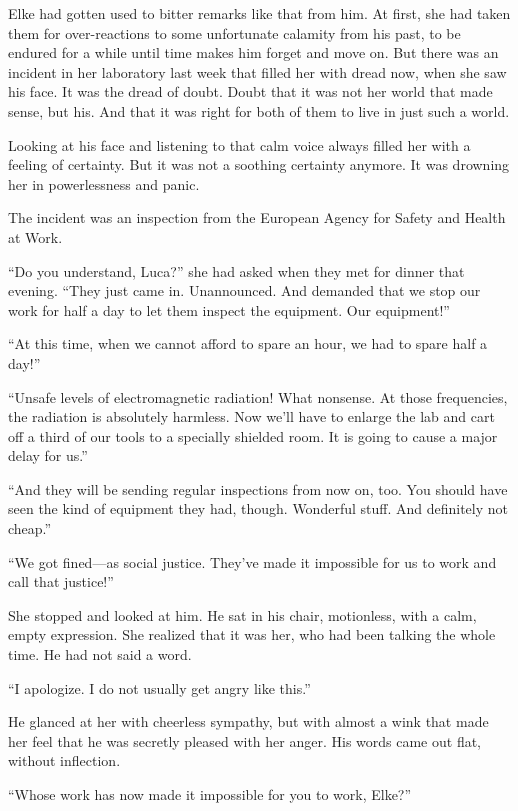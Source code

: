 \sectionline

Elke had gotten used to bitter remarks like that from him. At first, she had taken them for over-reactions to some unfortunate calamity from his past, to be endured for a while until time makes him forget and move on. But there was an incident in her laboratory last week that filled her with dread now, when she saw his face. It was the dread of doubt. Doubt that it was not her world that made sense, but his. And that it was right for both of them to live in just such a world.

Looking at his face and listening to that calm voice always filled her with a feeling of certainty. But it was not a soothing certainty anymore. It was drowning her in powerlessness and panic.

The incident was an inspection from the European Agency for Safety and Health at Work.

``Do you understand, Luca?'' she had asked when they met for dinner that evening. ``They just came in. Unannounced. And demanded that we stop our work for half a day to let them inspect the equipment. Our equipment!''

``At this time, when we cannot afford to spare an hour, we had to spare half a day!''

``Unsafe levels of electromagnetic radiation! What nonsense. At those frequencies, the radiation is absolutely harmless. Now we'll have to enlarge the lab and cart off a third of our tools to a specially shielded room. It is going to cause a major delay for us.''

``And they will be sending regular inspections from now on, too. You should have seen the kind of equipment they had, though. Wonderful stuff. And definitely not cheap.''

``We got fined---as social justice. They've made it impossible for us to work and call that justice!''

She stopped and looked at him. He sat in his chair, motionless, with a calm, empty expression. She realized that it was her, who had been talking the whole time. He had not said a word.

``I apologize. I do not usually get angry like this.''

He glanced at her with cheerless sympathy, but with almost a wink that made her feel that he was secretly pleased with her anger. His words came out flat, without inflection.

``Whose work has now made it impossible for you to work, Elke?''

